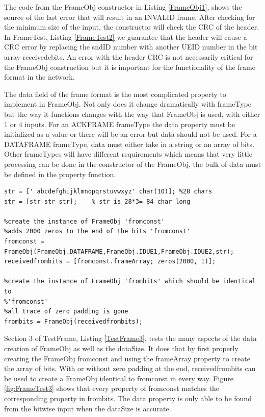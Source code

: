 The code from the FrameObj constructor in Listing \ref{FrameObj1}, shows the source of the last error that will result in an INVALID frame. After checking for the minimum size of the input, the constructor will check the CRC of the header. In FrameTest, Listing \ref{FrameTest2} we guarantee that the header will cause a CRC error by replacing the sndID number with another UEID number in the bit array receivedcbits. An error with the header CRC is not necessarily critical for the FrameObj construction but it is important for the functionality of the frame format in the network.

The data field of the frame format is the most complicated property to implement in FrameObj. Not only does it change dramatically with frameType but the way it functions changes with the way that FrameObj is used, with either 1 or 4 inputs. For an ACKFRAME frameType the data property must be initialized as a value or there will be an error but data should not be used. For a DATAFRAME frameType, data must either take in a string or an array of bits. Other frameTypes will have different requirements which means that very little processing can be done in the constructor of the FrameObj, the bulk of data must be defined in the property function. 

\begin{lstlisting} 
str = [' abcdefghijklmnopqrstuvwxyz' char(10)]; %28 chars
str = [str str str];    % str is 28*3= 84 char long

%create the instance of FrameObj 'fromconst'
%adds 2000 zeros to the end of the bits 'fromconst'
fromconst = FrameObj(FrameObj.DATAFRAME,FrameObj.IDUE1,FrameObj.IDUE2,str);
receivedfrombits = [fromconst.frameArray; zeros(2000, 1)];

%create the instance of FrameObj 'frombits' which should be identical to
%'fromconst' 
%all trace of zero padding is gone
frombits = FrameObj(receivedfrombits);
\end{lstlisting} 

Section 3 of TestFrame, Listing \ref{TestFrame3}, tests the many aspects of the data creation of FrameObj as well as the dataSize. It does that by first properly creating the FrameObj fromconst and using the frameArray property to create the array of bits. With or without zero padding at the end, receivedfrombits can be used to create a FrameObj identical to fromconst in every way. Figure \ref{fig:FrameTest3} shows that every property of fromconst matches the corresponding property in frombits. The data property is only able to be found from the bitwise input when the dataSize is accurate.   

